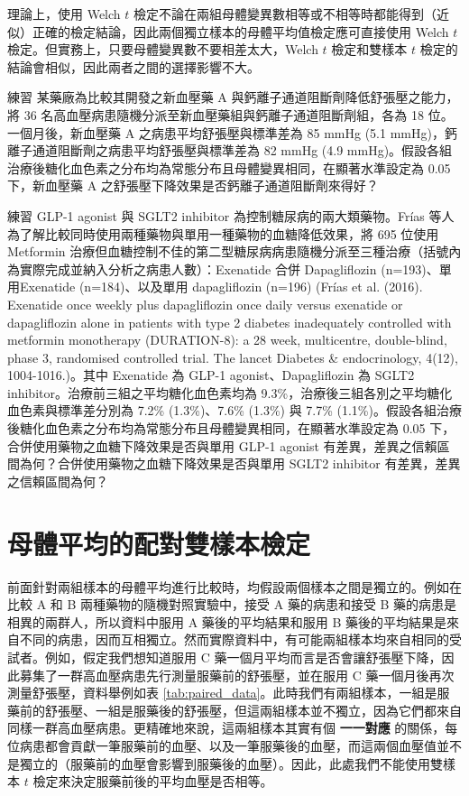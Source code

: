     理論上，使用 Welch $t$ 檢定不論在兩組母體變異數相等或不相等時都能得到（近似）正確的檢定結論，因此兩個獨立樣本的母體平均值檢定應可直接使用 Welch $t$ 檢定。但實務上，只要母體變異數不要相差太大，Welch $t$ 檢定和雙樣本 $t$ 檢定的結論會相似，因此兩者之間的選擇影響不大。

    \bigskip

    \begin{custom}{練習}
       某藥廠為比較其開發之新血壓藥 A 與鈣離子通道阻斷劑降低舒張壓之能力，將 36 名高血壓病患隨機分派至新血壓藥組與鈣離子通道阻斷劑組，各為 18 位。一個月後，新血壓藥 A 之病患平均舒張壓與標準差為 85 mmHg (5.1 mmHg)，鈣離子通道阻斷劑之病患平均舒張壓與標準差為 82 mmHg (4.9 mmHg)。假設各組治療後糖化血色素之分布均為常態分布且母體變異相同，在顯著水準設定為 0.05 下，新血壓藥 A 之舒張壓下降效果是否鈣離子通道阻斷劑來得好？
    \end{custom}
    
    \bigskip

    \begin{custom}{練習}
       GLP-1 agonist 與 SGLT2 inhibitor 為控制糖尿病的兩大類藥物。Frías 等人為了解比較同時使用兩種藥物與單用一種藥物的血糖降低效果，將 695 位使用 Metformin 治療但血糖控制不佳的第二型糖尿病病患隨機分派至三種治療（括號內為實際完成並納入分析之病患人數）：Exenatide 合併 Dapagliflozin (n=193)、單用Exenatide (n=184)、以及單用 dapagliflozin (n=196) (Frías et al. (2016). Exenatide once weekly plus dapagliflozin once daily versus exenatide or dapagliflozin alone in patients with type 2 diabetes inadequately controlled with metformin monotherapy (DURATION-8): a 28 week, multicentre, double-blind, phase 3, randomised controlled trial. The lancet Diabetes \& endocrinology, 4(12), 1004-1016.)。其中 Exenatide 為 GLP-1 agonist、Dapagliflozin 為 SGLT2 inhibitor。治療前三組之平均糖化血色素均為 9.3\%，治療後三組各別之平均糖化血色素與標準差分別為 7.2\% (1.3\%)、7.6\% (1.3\%) 與 7.7\% (1.1\%)。假設各組治療後糖化血色素之分布均為常態分布且母體變異相同，在顯著水準設定為 0.05 下，合併使用藥物之血糖下降效果是否與單用 GLP-1 agonist 有差異，差異之信賴區間為何？合併使用藥物之血糖下降效果是否與單用 SGLT2 inhibitor 有差異，差異之信賴區間為何？
    \end{custom}

\section{母體平均的配對雙樣本檢定}
    前面針對兩組樣本的母體平均進行比較時，均假設兩個樣本之間是獨立的。例如在比較 A 和 B 兩種藥物的隨機對照實驗中，接受 A 藥的病患和接受 B 藥的病患是相異的兩群人，所以資料中服用 A 藥後的平均結果和服用 B 藥後的平均結果是來自不同的病患，因而互相獨立。然而實際資料中，有可能兩組樣本均來自相同的受試者。例如，假定我們想知道服用 C 藥一個月平均而言是否會讓舒張壓下降，因此募集了一群高血壓病患先行測量服藥前的舒張壓，並在服用 C 藥一個月後再次測量舒張壓，資料舉例如表 \ref{tab:paired_data}。此時我們有兩組樣本，一組是服藥前的舒張壓、一組是服藥後的舒張壓，但這兩組樣本並不獨立，因為它們都來自同樣一群高血壓病患。更精確地來說，這兩組樣本其實有個 \textbf{一一對應} 的關係，每位病患都會貢獻一筆服藥前的血壓、以及一筆服藥後的血壓，而這兩個血壓值並不是獨立的（服藥前的血壓會影響到服藥後的血壓）。因此，此處我們不能使用雙樣本 $t$ 檢定來決定服藥前後的平均血壓是否相等。

